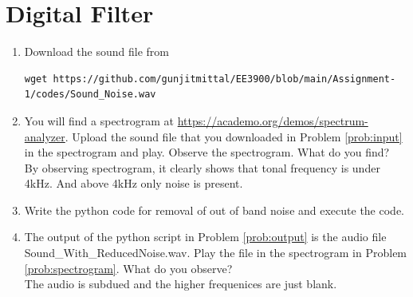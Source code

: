\documentclass[journal,12pt,twocolumn]{IEEEtran}
\renewcommand\thesection{\arabic{section}}
\begin{document}
\section{Digital Filter}
\begin{enumerate}[label=\thesection.\arabic*
,ref=\thesection.\theenumi]
\item
\label{prob:input}
Download the sound file from  
\begin{lstlisting}
wget https://github.com/gunjitmittal/EE3900/blob/main/Assignment-1/codes/Sound_Noise.wav
\end{lstlisting}
\item
\label{prob:spectrogram}
You will find a spectrogram at \href{https://academo.org/demos/spectrum-analyzer}{\url{https://academo.org/demos/spectrum-analyzer}}. 
%
Upload the sound file that you downloaded in Problem \ref{prob:input} in the spectrogram  and play.  Observe the spectrogram. What do you find?
\\
%
\solution 
By observing spectrogram, it clearly shows that tonal frequency is under 4kHz. And above 4kHz only noise is present.
\item \label{prob:output}
Write the python code for removal of out of band noise and execute the code.
\\
\solution

\item
The output of the python script in Problem \ref{prob:output} is the audio file Sound\_With\_ReducedNoise.wav. Play the file in the spectrogram in Problem \ref{prob:spectrogram}. What do you observe?
\\
\solution The audio is subdued and the higher frequenices are just blank.
\end{enumerate}
\end{document}
